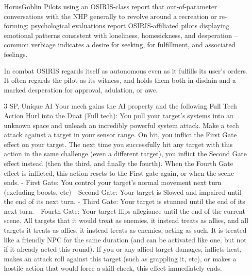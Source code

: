 \begin{mech}{Horus}{Goblin}
Pilots using an OSIRIS-class report that out-of-parameter conversations with the NHP generally to revolve around a recreation or re-forming; psychological evaluations report OSIRIS-affiliated pilots displaying emotional patterns consistent with loneliness, homesickness, and desperation -- common verbiage indicates a desire for seeking, for fulfillment, and associated feelings.

In combat OSIRIS regards itself as autonomous even as it fulfills its user’s orders. It often regards the pilot as its witness, and holds them both in disdain and a marked desperation for approval, adulation, or awe. 


3 SP, Unique
AI
Your mech gains the AI property and the following Full Tech Action
Hurl into the Duat (Full tech): You pull your target’s systems into an unknown space and unleash an incredibly powerful system attack. Make a tech attack against a target in your sensor range. On hit, you inflict the First Gate effect on your target. The next time you successfully hit any target with this action in the same challenge (even a different target), you inflict the Second Gate effect instead (then the third, and finally the fourth). When the Fourth Gate effect is inflicted, this action resets to the First gate again, or when the scene ends.
	- First Gate: You control your target’s normal movement next turn (excluding boosts, etc)
	- Second Gate: Your target is Slowed and impaired until the end of its next turn.
	- Third Gate: Your target is stunned until the end of its next turn.
	- Fourth Gate: Your target flips allegiance until the end of the current scene. All targets that it would treat as enemies, it instead treats as allies, and all targets it treats as allies, it instead treats as enemies, acting as such. It is treated like a friendly NPC for the same duration (and can be activated like one, but not if it already acted this round). If you or any allied target damages, inflicts heat, makes an attack roll against this target (such as grappling it, etc), or makes a hostile action that would force a skill check, this effect immediately ends.


\end{mech}
